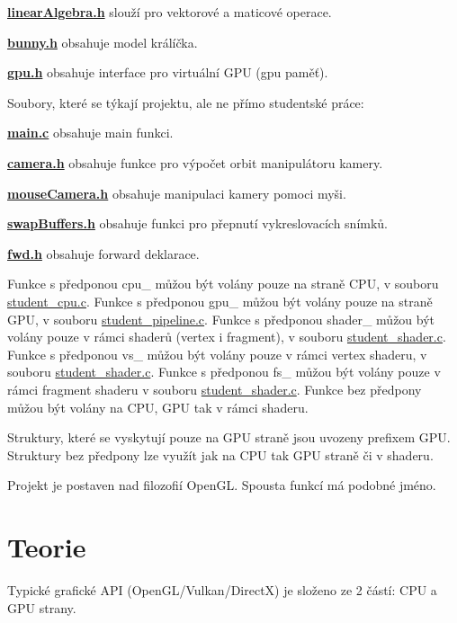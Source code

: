 {\bfseries \hyperlink{linearAlgebra_8h}{linear\+Algebra.\+h}} slouží pro vektorové a maticové operace.

{\bfseries \hyperlink{bunny_8h}{bunny.\+h}} obsahuje model králíčka.

{\bfseries \hyperlink{gpu_8h}{gpu.\+h}} obsahuje interface pro virtuální G\+PU (gpu paměť).

Soubory, které se týkají projektu, ale ne přímo studentské práce\+:

{\bfseries \hyperlink{main_8c}{main.\+c}} obsahuje main funkci.

{\bfseries \hyperlink{camera_8h}{camera.\+h}} obsahuje funkce pro výpočet orbit manipulátoru kamery.

{\bfseries \hyperlink{mouseCamera_8h}{mouse\+Camera.\+h}} obsahuje manipulaci kamery pomoci myši.

{\bfseries \hyperlink{swapBuffers_8h}{swap\+Buffers.\+h}} obsahuje funkci pro přepnutí vykreslovacích snímků.

{\bfseries \hyperlink{fwd_8h}{fwd.\+h}} obsahuje forward deklarace.

Funkce s předponou cpu\+\_\+ můžou být volány pouze na straně C\+PU, v souboru \hyperlink{student__cpu_8c}{student\+\_\+cpu.\+c}. Funkce s předponou gpu\+\_\+ můžou být volány pouze na straně G\+PU, v souboru \hyperlink{student__pipeline_8c}{student\+\_\+pipeline.\+c}. Funkce s předponou shader\+\_\+ můžou být volány pouze v rámci shaderů (vertex i fragment), v souboru \hyperlink{student__shader_8c}{student\+\_\+shader.\+c}. Funkce s předponou vs\+\_\+ můžou být volány pouze v rámci vertex shaderu, v souboru \hyperlink{student__shader_8c}{student\+\_\+shader.\+c}. Funkce s předponou fs\+\_\+ můžou být volány pouze v rámci fragment shaderu v souboru \hyperlink{student__shader_8c}{student\+\_\+shader.\+c}. Funkce bez předpony můžou být volány na C\+PU, G\+PU tak v rámci shaderu.

Struktury, které se vyskytují pouze na G\+PU straně jsou uvozeny prefixem G\+PU. Struktury bez předpony lze využít jak na C\+PU tak G\+PU straně či v shaderu.

Projekt je postaven nad filozofií Open\+GL. Spousta funkcí má podobné jméno.\hypertarget{index_teorie}{}\section{Teorie}\label{index_teorie}
Typické grafické A\+PI (Open\+G\+L/\+Vulkan/\+DirectX) je složeno ze 2 částí\+: C\+PU a G\+PU strany.

